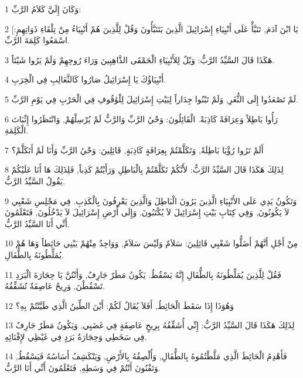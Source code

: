 \par 1 وَكَانَ إِلَيَّ كَلاَمُ الرَّبِّ:
\par 2 [يَا ابْنَ آدَمَ, تَنَبَّأْ عَلَى أَنْبِيَاءِ إِسْرَائِيلَ الَّذِينَ يَتَنَبَّأُونَ وَقُلْ لِلَّذِينَ هُمْ أَنْبِيَاءُ مِنْ تِلْقَاءِ ذَوَاتِهِمِ: اسْمَعُوا كَلِمَةَ الرَّبِّ.
\par 3 هَكَذَا قَالَ السَّيِّدُ الرَّبُّ: وَيْلٌ لِلأَنْبِيَاءِ الْحَمْقَى الذَّاهِبِينَ وَرَاءَ رُوحِهِمْ وَلَمْ يَرُوا شَيْئاً.
\par 4 أَنْبِيَاؤُكَ يَا إِسْرَائِيلُ صَارُوا كَالثَّعَالِبِ فِي الْخِرَبِ.
\par 5 لَمْ تَصْعَدُوا إِلَى الثُّغَرِ, وَلَمْ تَبْنُوا جِدَاراً لِبَيْتِ إِسْرَائِيلَ لِلْوُقُوفِ فِي الْحَرْبِ فِي يَوْمِ الرَّبِّ.
\par 6 رَأُوا بَاطِلاً وَعِرَافَةً كَاذِبَةً. الْقَائِلُونَ: وَحْيُ الرَّبِّ وَالرَّبُّ لَمْ يُرْسِلْهُمْ, وَانْتَظَرُوا إِثْبَاتَ الْكَلِمَةِ.
\par 7 أَلَمْ تَرُوا رُؤْيَا بَاطِلَةً, وَتَكَلَّمْتُمْ بِعِرَافَةٍ كَاذِبَةٍ, قَائِلِينَ: وَحْيُ الرَّبِّ وَأَنَا لَمْ أَتَكَلَّمْ؟
\par 8 لِذَلِكَ هَكَذَا قَالَ السَّيِّدُ الرَّبُّ: لأَنَّكُمْ تَكَلَّمْتُمْ بِالْبَاطِلِ وَرَأَيْتُمْ كَذِباً, فَلِذَلِكَ هَا أَنَا عَلَيْكُمْ يَقُولُ السَّيِّدُ الرَّبُّ.
\par 9 وَتَكُونُ يَدِي عَلَى الأَنْبِيَاءِ الَّذِينَ يَرُونَ الْبَاطِلَ وَالَّذِينَ يَعْرِفُونَ بِالْكَذِبِ. فِي مَجْلِسِ شَعْبِي لاَ يَكُونُونَ, وَفِي كِتَابِ بَيْتِ إِسْرَائِيلَ لاَ يُكْتَبُونَ, وَإِلَى أَرْضِ إِسْرَائِيلَ لاَ يَدْخُلُونَ, فَتَعْلَمُونَ أَنِّي أَنَا السَّيِّدُ الرَّبُّ.
\par 10 مِنْ أَجْلِ أَنَّهُمْ أَضَلُّوا شَعْبِي قَائِلِينَ: سَلاَمٌ وَلَيْسَ سَلاَمٌ, وَوَاحِدٌ مِنْهُمْ يَبْنِي حَائِطاً وَهَا هُمْ يُمَلِّطُونَهُ بِالطُّفَالِ.
\par 11 فَقُلْ لِلَّذِينَ يُمَلِّطُونَهُ بِالطُّفَالِ إِنَّهُ يَسْقُطُ. يَكُونُ مَطَرٌ جَارِفٌ, وَأَنْتُنَّ يَا حِجَارَةَ الْبَرَدِ تَسْقُطْنَ, وَرِيحٌ عَاصِفَةٌ تُشَقِّقُهُ.
\par 12 وَهُوَذَا إِذَا سَقَطَ الْحَائِطُ, أَفَلاَ يُقَالُ لَكُمْ: أَيْنَ الطِّينُ الَّذِي طَيَّنْتُمْ بِهِ؟
\par 13 لِذَلِكَ هَكَذَا قَالَ السَّيِّدُ الرَّبُّ: إِنِّي أُشَقِّقُهُ بِرِيحٍ عَاصِفَةٍ فِي غَضَبِي, وَيَكُونُ مَطَرٌ جَارِفٌ فِي سَخَطِي وَحِجَارَةُ بَرَدٍ فِي غَيْظِي لإِفْنَائِهِ.
\par 14 فَأَهْدِمُ الْحَائِطَ الَّذِي مَلَّطْتُمُوهُ بِالطُّفَالِ, وَأُلْصِقُهُ بِالأَرْضِ, وَيَنْكَشِفُ أَسَاسُهُ فَيَسْقُطُ, وَتَفْنُونَ أَنْتُمْ فِي وَسَطِهِ, فَتَعْلَمُونَ أَنِّي أَنَا الرَّبُّ.
